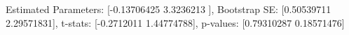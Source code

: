 Estimated Parameters: [-0.13706425  3.3236213 ], Bootstrap SE: [0.50539711 2.29571831], t-stats: [-0.2712011   1.44774788], p-values: [0.79310287 0.18571476]